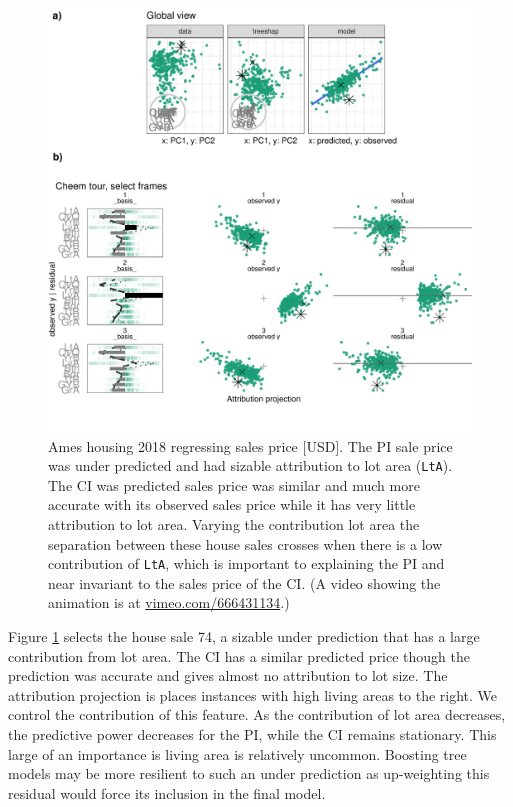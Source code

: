\documentclass[
]{article}
\begin{document}
\begin{figure}

{\centering \includegraphics[width=1\linewidth]{./figures/case_ames2018} 

}

\caption{Ames housing 2018 regressing sales price {[}USD{]}. The PI sale price was under predicted and had sizable attribution to lot area (\texttt{LtA}). The CI was predicted sales price was similar and much more accurate with its observed sales price while it has very little attribution to lot area. Varying the contribution lot area the separation between these house sales crosses when there is a low contribution of \texttt{LtA}, which is important to explaining the PI and near invariant to the sales price of the CI. (A video showing the animation is at \href{https://vimeo.com/666431134}{vimeo.com/666431134}.)}\label{fig:caseames}
\end{figure}

Figure \ref{fig:caseames} selects the house sale 74, a sizable under prediction that has a large contribution from lot area. The CI has a similar predicted price though the prediction was accurate and gives almost no attribution to lot size. The attribution projection is places instances with high living areas to the right. We control the contribution of this feature. As the contribution of lot area decreases, the predictive power decreases for the PI, while the CI remains stationary. This large of an importance is living area is relatively uncommon. Boosting tree models may be more resilient to such an under prediction as up-weighting this residual would force its inclusion in the final model.
\end{document}
